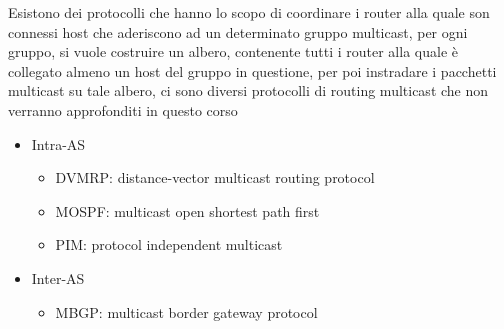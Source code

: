 \documentclass[12pt, letterpaper]{article}
\begin{document}
Esistono dei protocolli che hanno lo scopo di coordinare i router alla quale son connessi host che aderiscono ad un 
determinato gruppo multicast, per ogni gruppo, si vuole costruire un albero, contenente tutti i router alla quale è collegato 
almeno un host del gruppo in questione, per poi instradare i pacchetti multicast su tale albero, ci sono diversi protocolli 
di routing multicast che non verranno approfonditi in questo corso\begin{itemize}
    \item Intra-AS\begin{itemize}
        \item DVMRP: distance-vector multicast routing protocol
        \item  MOSPF: multicast open shortest path first 
        \item PIM: protocol independent multicast
    \end{itemize}
    \item Inter-AS\begin{itemize}
        \item MBGP: multicast border gateway protocol
    \end{itemize}
\end{itemize}
\end{document}
